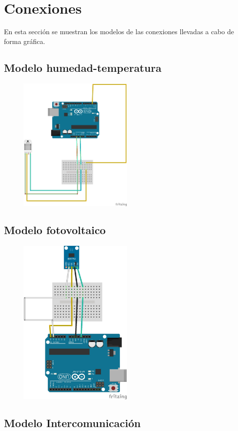 \section{Conexiones}\label{sec:conexiones}

En esta secci\'on se muestran los modelos de las conexiones llevadas a
cabo de forma gr\'afica.

\subsection{Modelo humedad-temperatura}
\begin{figure}\label{fig:dht22}
\includegraphics[width=0.5\textwidth]{images/dht22_bb.png}
\end{figure}
\subsection{Modelo fotovoltaico}
\begin{figure}\label{fig:bh1750}
\includegraphics[width=0.5\textwidth]{images/bh1750.jpg}
\end{figure}
\subsection{Modelo Intercomunicaci\'on}
